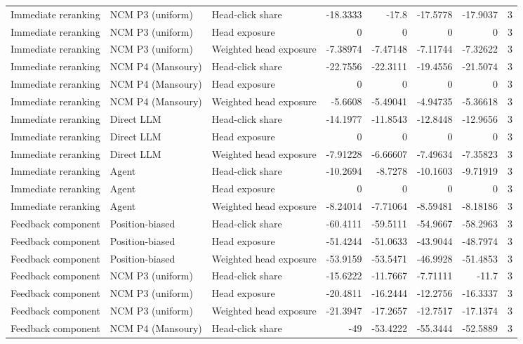 \begin{table}[htbp!]
\begin{tabular}{lllrrrrr}
Immediate reranking & NCM P3 (uniform) & Head-click share & -18.3333 & -17.8 & -17.5778 & -17.9037 & 3 \\
Immediate reranking & NCM P3 (uniform) & Head exposure & 0 & 0 & 0 & 0 & 3 \\
Immediate reranking & NCM P3 (uniform) & Weighted head exposure & -7.38974 & -7.47148 & -7.11744 & -7.32622 & 3 \\
Immediate reranking & NCM P4 (Mansoury) & Head-click share & -22.7556 & -22.3111 & -19.4556 & -21.5074 & 3 \\
Immediate reranking & NCM P4 (Mansoury) & Head exposure & 0 & 0 & 0 & 0 & 3 \\
Immediate reranking & NCM P4 (Mansoury) & Weighted head exposure & -5.6608 & -5.49041 & -4.94735 & -5.36618 & 3 \\
Immediate reranking & Direct LLM & Head-click share & -14.1977 & -11.8543 & -12.8448 & -12.9656 & 3 \\
Immediate reranking & Direct LLM & Head exposure & 0 & 0 & 0 & 0 & 3 \\
Immediate reranking & Direct LLM & Weighted head exposure & -7.91228 & -6.66607 & -7.49634 & -7.35823 & 3 \\
Immediate reranking & Agent & Head-click share & -10.2694 & -8.7278 & -10.1603 & -9.71919 & 3 \\
Immediate reranking & Agent & Head exposure & 0 & 0 & 0 & 0 & 3 \\
Immediate reranking & Agent & Weighted head exposure & -8.24014 & -7.71064 & -8.59481 & -8.18186 & 3 \\
Feedback component & Position-biased & Head-click share & -60.4111 & -59.5111 & -54.9667 & -58.2963 & 3 \\
Feedback component & Position-biased & Head exposure & -51.4244 & -51.0633 & -43.9044 & -48.7974 & 3 \\
Feedback component & Position-biased & Weighted head exposure & -53.9159 & -53.5471 & -46.9928 & -51.4853 & 3 \\
Feedback component & NCM P3 (uniform) & Head-click share & -15.6222 & -11.7667 & -7.71111 & -11.7 & 3 \\
Feedback component & NCM P3 (uniform) & Head exposure & -20.4811 & -16.2444 & -12.2756 & -16.3337 & 3 \\
Feedback component & NCM P3 (uniform) & Weighted head exposure & -21.3947 & -17.2657 & -12.7517 & -17.1374 & 3 \\
Feedback component & NCM P4 (Mansoury) & Head-click share & -49 & -53.4222 & -55.3444 & -52.5889 & 3 \\

\end{tabular}
\end{table}
